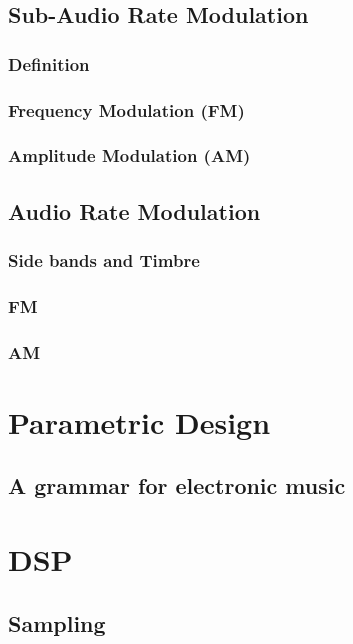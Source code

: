 \documentclass[11pt]{article}
\begin{document}
\subsection{Sub-Audio Rate Modulation}
\label{sec:org95c2c42}
\subsubsection{Definition}
\label{sec:org2e7b158}
\subsubsection{Frequency Modulation (FM)}
\label{sec:org7b8ee29}
\subsubsection{Amplitude Modulation (AM)}
\label{sec:org17146a7}
\subsection{Audio Rate Modulation}
\label{sec:orgf3b6611}
\subsubsection{Side bands and Timbre}
\label{sec:org067505a}
\subsubsection{FM}
\label{sec:org7f691ff}
\subsubsection{AM}
\label{sec:org511d119}

\section{Parametric Design}
\label{sec:org680364a}
\subsection{A grammar for electronic music}
\label{sec:org7e12ceb}

\section{DSP}
\label{sec:orga8c7a81}
\subsection{Sampling}
\label{sec:orgaacd2e2}
\end{document}
